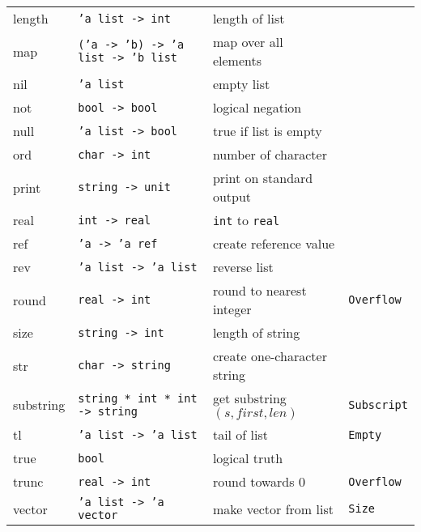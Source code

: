 \documentclass[fleqn]{article}
\begin{document}
\begin{tabular}{@{\tt\ \ }llll}
length      & {\tt 'a list -> int}        & length of list\\

map         & {\tt ('a -> 'b) -> 'a list -> 'b list}
            & map over all elements\\

nil         & {\tt 'a list} &               empty list\\

not         & {\tt bool -> bool} &          logical negation\\

null        & {\tt 'a list -> bool}       & true if list is empty\\

ord         & {\tt char -> int} &           number of character\\

print       & {\tt string -> unit} & print on standard output\\

real        & {\tt int -> real} &           {\tt int} to {\tt real}\\

ref         & {\tt 'a -> 'a ref} &       create reference value\\

rev         & {\tt 'a list -> 'a list}    & reverse list\\

round       & {\tt real -> int} &           round to nearest integer 
        & {\tt Overflow}\\

size        & {\tt string -> int} &         length of string\\

str         & {\tt char -> string} &        create one-character string\\

substring   & {\tt string * int * int -> string} & get substring
$(s, first, len)$ & {\tt Subscript}\\

tl          & {\tt 'a list -> 'a list}    & tail of list & {\tt Empty}\\

true        & {\tt bool} & logical truth \\

trunc       & {\tt real -> int} &           round towards $0$ 
        & {\tt Overflow}\\

vector      & {\tt 'a list -> 'a vector} & make vector from list & 
              {\tt Size}\\\hline 
\end{tabular}
\end{document}
